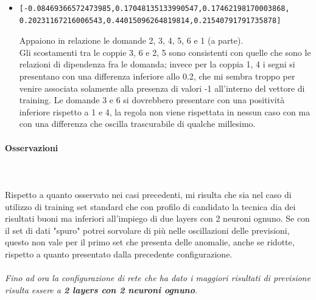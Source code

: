 \begin{itemize}
\item \begin{verbatim}[-0.08469366572473985,0.17048135133990547,0.17462198170003868,
0.20231167216006543,0.44015096264819814,0.21540791791735878]
\end{verbatim}
Appaiono in relazione le domande 2, 3, 4, 5, 6 e 1 (a parte).\\
Gli scostamenti tra le coppie 3, 6 e 2, 5 sono consistenti con quelle che sono le relazioni di dipendenza fra le domanda; invece per la coppia 1, 4 i segni si presentano con una differenza inferiore allo 0.2, che mi sembra troppo per venire associata solamente alla presenza di valori -1 all'interno del vettore di training.
Le domande 3 e 6 si dovrebbero presentare con una positivit\`a inferiore rispetto a 1 e 4, la regola non viene rispettata in nessun caso con ma con una differenza che oscilla trascurabile di qualche millesimo.
\end{itemize}

\paragraph{Osservazioni}\mbox{}
\label{Osservazioni su rete a 4 neuroni per 1 layer}
\\\\
\noindent
Rispetto a quanto osservato nei casi precedenti, mi risulta che sia nel caso di utilizzo di training set standard che con profilo di candidato la tecnica dia dei risultati buoni ma inferiori all'impiego di due layers con 2 neuroni ognuno. Se con il set di dati "spuro" potrei sorvolare di pi\`u nelle oscillazioni delle previsioni, questo non vale per il primo set che presenta delle anomalie, anche se ridotte, rispetto a quanto presentato dalla precedente configurazione.
\\\\
\noindent
\textit{Fino ad ora la configurazione di rete che ha dato i maggiori risultati di previsione risulta essere a \textbf{2 layers con 2 neuroni ognuno}.}



